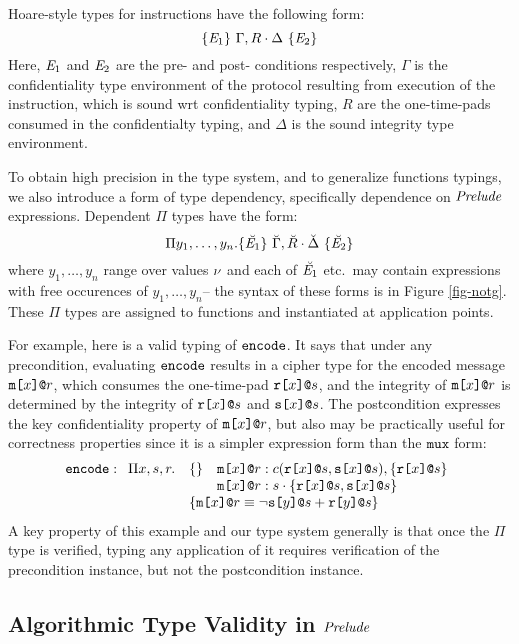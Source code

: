 Hoare-style types for instructions have the following form:
$$
\{ \mathit{E}_1 \}\ \Gamma,R \cdot \Delta\ \{ \mathit{E}_2 \}
$$
Here, $\mathit{E}_1$ and $\mathit{E}_2$ are the pre- and post- conditions
respectively, $\Gamma$ is the confidentiality type environment of the
protocol resulting from execution of the instruction, which is sound
wrt confidentiality typing, $R$ are the one-time-pads consumed in the
confidentialty typing, and $\Delta$ is the sound integrity type
environment.

\notgfig

To obtain high precision in the type system, and to generalize
functions typings, we also introduce a form of type dependency,
specifically dependence on $\mathit{Prelude}$ expressions. Dependent
$\Pi$ types have the form:
$$
\Pi y_1,\ldots,y_n . \{ \breve{\mathit{E}_1} \}\ \breve{\Gamma},\breve{R} \cdot \breve{\Delta}\ \{ \breve{\mathit{E}_2} \}
$$
where $y_1,\ldots,y_n$ range over values $\nu$ and each of
$\breve{\mathit{E}_1}$ etc.~may contain expressions with free occurences
of $y_1,\ldots,y_n$-- the syntax of these forms is in Figure
\ref{fig-notg}. These $\Pi$ types are assigned to functions
and instantiated at application points. 

For example, here is a valid typing of $\texttt{encode}$.  It says that
under any precondition, evaluating $\texttt{encode}$ results in a cipher
type for the encoded message $\texttt{m[}x\texttt{]}\texttt{@}r$, which consumes the
one-time-pad $\texttt{r[}x\texttt{]}\texttt{@}s$, and the integrity of $\texttt{m[}x\texttt{]}\texttt{@}r$ is
determined by the integrity of $\texttt{r[}x\texttt{]}\texttt{@}s$ and $\texttt{s[}x\texttt{]}\texttt{@}s$. The
postcondition expresses the key confidentiality property of
$\texttt{m[}x\texttt{]}\texttt{@}r$, but also may be practically useful for correctness
properties since it is a simpler expression form than the $\texttt{mux}$
form:
$$
\ttt{encode} :
\begin{array}[t]{ll}
  \Pi x,s,r . & \{ \} \quad \mx{x}{r} : \cty{\rx{x}{s}}{\sx{x}{s}}, \{ \rx{x}{s} \} \\
  & \phantom{\{ \}} \quad \mx{x}{r} : \ity{s}{\{ \rx{x}{s}, \sx{x}{s} \}} \\
  & \{ \mx{x}{r} \eop \neg\sx{y}{s} \fplus \rx{y}{s} \}
\end{array}
$$
A key property of this example and our type system generally is that once
the $\Pi$ type is verified, typing any application of it requires verification
of the precondition instance, but not the postcondition instance.

\subsection{Algorithmic Type Validity in $\mathit{Prelude}$}

